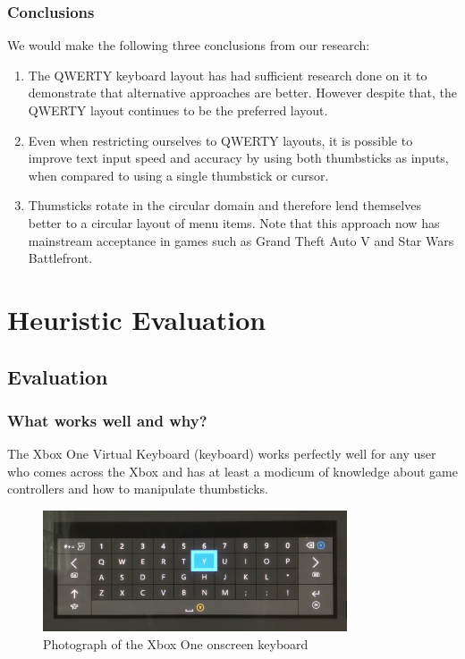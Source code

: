 \documentclass[
	letterpaper, %
]{jdf}
\begin{document}
\subsubsection{Conclusions}
We would make the following three conclusions from our research:
\begin{enumerate}
    \item The QWERTY keyboard layout has had sufficient research done on it to demonstrate that alternative approaches are better. However despite that, the QWERTY layout continues to be the preferred layout.
    \item Even when restricting ourselves to QWERTY layouts, it is possible to improve text input speed and accuracy by using both thumbsticks as inputs, when compared to using a single thumbstick or cursor.
    \item Thumsticks rotate in the circular domain and therefore lend themselves better to a circular layout of menu items. Note that this approach now has mainstream acceptance in games such as Grand Theft Auto V and Star Wars Battlefront.
\end{enumerate}

\section{Heuristic Evaluation}
\subsection{Evaluation}
\subsubsection{What works well and why?}
The Xbox One Virtual Keyboard (keyboard) works perfectly well for any user who comes across the Xbox and has at least a modicum of knowledge about game controllers and how to manipulate thumbsticks.

\begin{figure}[h]
	\centering
	\includegraphics[width=9cm]{jdf-master/Figures/xbox-one-keyboard-photo.jpg}
	\caption{Photograph of the Xbox One onscreen keyboard}
	\label{fig:keyboard-photo}
\end{figure}
\end{document}
